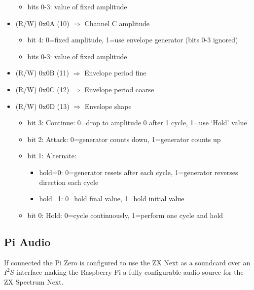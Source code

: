 \begin{itemize}
\begin{itemize}
  \item bits 0-3: value of fixed amplitude
  \end{itemize}
\item (R/W) 0x0A (10) $\Rightarrow$ Channel C amplitude
  \begin{itemize}
  \item bit 4: 0=fixed amplitude, 1=use envelope generator (bits 0-3 ignored)
  \item bits 0-3: value of fixed amplitude
  \end{itemize}
\item (R/W) 0x0B (11) $\Rightarrow$ Envelope period fine
\item (R/W) 0x0C (12) $\Rightarrow$ Envelope period coarse
\item (R/W) 0x0D (13) $\Rightarrow$ Envelope shape
  \begin{itemize}
  \item bit 3: Continue: 0=drop to amplitude 0 after 1 cycle, 1=use ‘Hold’ value
  \item bit 2: Attack: 0=generator counts down, 1=generator counts up
  \item bit 1: Alternate:
    \begin{itemize}
    \item hold=0: 0=generator resets after each cycle, 1=generator
      reverses direction each cycle
    \item hold=1: 0=hold final value, 1=hold initial value
    \end{itemize}
  \item bit 0: Hold: 0=cycle continuously, 1=perform one cycle and hold
  \end{itemize}
\end{itemize}

\subsection{Pi Audio}
If connected the Pi Zero is configured to use the ZX Next as a
soundcard over an $I^2S$ interface making the Raspberry Pi a fully
configurable audio source for the ZX Spectrum Next.
